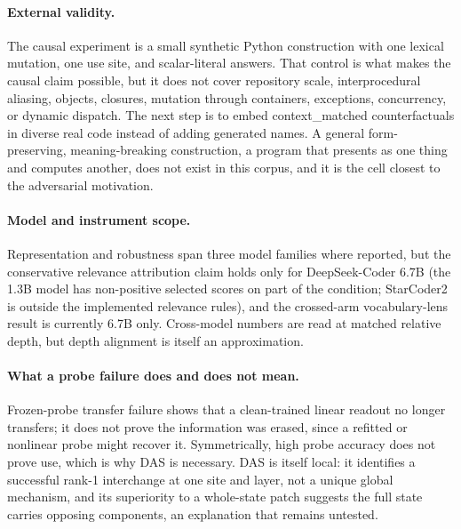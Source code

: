 \documentclass[10pt]{article}
\newcommand{\cm}{\textsf{context\_matched}}
\begin{document}
\paragraph{External validity.} The causal experiment is a small synthetic Python
construction with one lexical mutation, one use site, and scalar-literal answers.
That control is what makes the causal claim possible, but it does not cover
repository scale, interprocedural aliasing, objects, closures, mutation through
containers, exceptions, concurrency, or dynamic dispatch. The next step is to
embed \cm{} counterfactuals in diverse real code instead of adding generated names.
A general form-preserving, meaning-breaking construction, a program that presents
as one thing and computes another, does not exist in this corpus, and it is the
cell closest to the adversarial motivation.

\paragraph{Model and instrument scope.} Representation and robustness span three
model families where reported, but the conservative relevance attribution claim holds only for
DeepSeek-Coder 6.7B (the 1.3B model has non-positive selected scores on part of
the condition; StarCoder2 is outside the implemented relevance rules), and the
crossed-arm vocabulary-lens result is currently 6.7B only. Cross-model numbers are
read at matched relative depth, but depth alignment is itself an approximation.

\paragraph{What a probe failure does and does not mean.} Frozen-probe transfer
failure shows that a clean-trained linear readout no longer transfers; it does not
prove the information was erased, since a refitted or nonlinear probe might recover
it. Symmetrically, high probe accuracy does not prove use, which is why DAS is
necessary. DAS is itself local: it identifies a successful rank-1 interchange at
one site and layer, not a unique global mechanism, and its superiority to a
whole-state patch suggests the full state carries opposing components, an
explanation that remains untested.
\end{document}
